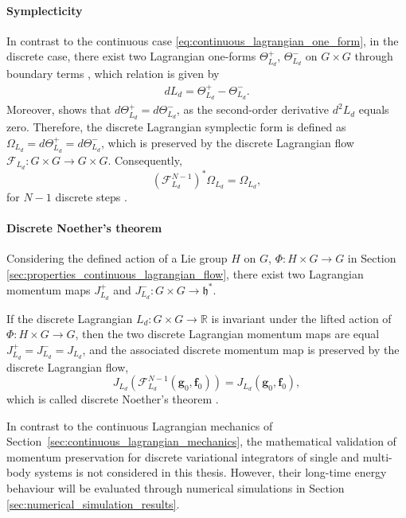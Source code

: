 \paragraph{Symplecticity}
In contrast to the continuous case \eqref{eq:continuous_lagrangian_one_form}, 
in the discrete case, there exist two Lagrangian one-forms $\Theta_{L_d}^{+}$, $\Theta_{L_d}^{-}$ on $G \times G$ through 
boundary terms \cite{Marsden2001}, which relation is given by
\begin{align*}
    dL_d =
    \Theta_{L_d}^{+} - \Theta_{L_d}^{-}.
\end{align*}
Moreover, \cite{Marsden2001} shows that $d\Theta_{L_d}^{+}=d\Theta_{L_d}^{-}$,
as the second-order derivative $d^2L_d$ equals zero. Therefore, the discrete Lagrangian symplectic form 
is defined as $\Omega_{L_d}=d\Theta_{L_d}^{+}=d\Theta_{L_d}^{-}$, 
which is preserved by the discrete Lagrangian flow $\mathcal F_{L_d}: G \times G \to G \times G$.
Consequently,
\begin{equation}
    (\mathcal F_{L_d}^{N-1})^*\Omega_{L_d}
    =
    \Omega_{L_d},
\end{equation}
for $N-1$ discrete steps \cite{Marsden2001}.

\paragraph{Discrete Noether's theorem}
Considering the defined action of a Lie group $H$ on $G$, $\Phi: H \times G \to G$ in Section 
\ref{sec:properties_continuous_lagrangian_flow}, there exist two Lagrangian momentum maps
$J_{L_d}^+$ and $J_{L_d}^-: G \times G \to \mathfrak h^*$.

\begin{theorem}
\label{thm:discrete_noether}
If the discrete Lagrangian $L_d : G \times G \to \mathbb{R}$ is invariant 
under the lifted action of $\Phi: H \times G \to G$, then the two discrete 
Lagrangian momentum maps are equal $J_{L_d}^+=J_{L_d}^-=J_{L_d}$, and the 
associated discrete momentum map is preserved by the discrete Lagrangian flow,
\begin{equation}
    J_{L_d}\!\left(
        \mathcal F_{L_d}^{N-1}(\bm{g}_0,\bm{f}_0)
    \right)
    =
    J_{L_d}(\bm{g}_0,\bm{f}_0),
\end{equation}
which is called discrete Noether's theorem \cite{Marsden2001}.
\end{theorem}

In contrast to the continuous Lagrangian mechanics of 
Section~\ref{sec:continuous_lagrangian_mechanics}, 
the mathematical validation of momentum preservation for discrete variational integrators of
single and multi-body systems 
is not considered in this thesis. However, their long-time energy behaviour will be 
evaluated through numerical simulations in Section \ref{sec:numerical_simulation_results}.

